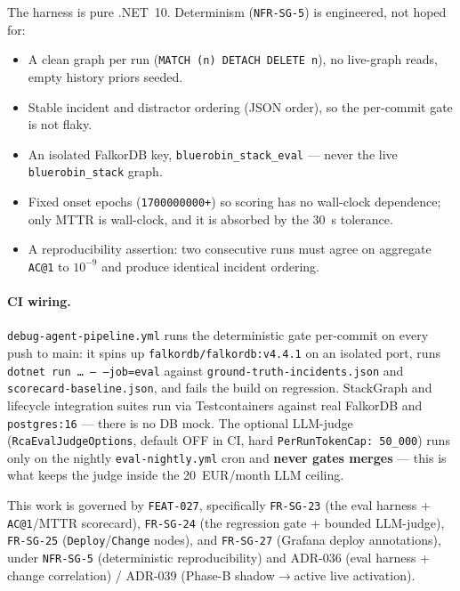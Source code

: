 \documentclass[11pt]{article}
\makeatletter
\newcommand{\acone}{\texttt{AC@1}}
\newcommand{\code}[1]{\texttt{#1}}
\makeatother
\begin{document}
The harness is pure .NET~10. Determinism (\code{NFR-SG-5}) is engineered, not hoped for:

\begin{itemize}
  \item A clean graph per run (\code{MATCH (n) DETACH DELETE n}), no live-graph reads, empty
  history priors seeded.
  \item Stable incident and distractor ordering (JSON order), so the per-commit gate is not
  flaky.
  \item An isolated FalkorDB key, \code{bluerobin\_stack\_eval} --- never the live
  \code{bluerobin\_stack} graph.
  \item Fixed onset epochs (\code{1700000000+}) so scoring has no wall-clock dependence; only
  MTTR is wall-clock, and it is absorbed by the 30~s tolerance.
  \item A reproducibility assertion: two consecutive runs must agree on aggregate \acone{} to
  $10^{-9}$ and produce identical incident ordering.
\end{itemize}

\paragraph{CI wiring.}
\code{debug-agent-pipeline.yml} runs the deterministic gate per-commit on every push to
main: it spins up \code{falkordb/falkordb:v4.4.1} on an isolated port, runs
\code{dotnet run \ldots{} -- --job=eval} against \code{ground-truth-incidents.json} and
\code{scorecard-baseline.json}, and fails the build on regression. StackGraph and lifecycle
integration suites run via Testcontainers against real FalkorDB and \code{postgres:16} ---
there is no DB mock. The optional LLM-judge (\code{RcaEvalJudgeOptions}, default OFF in CI,
hard \code{PerRunTokenCap: 50\_000}) runs only on the nightly \code{eval-nightly.yml} cron
and \textbf{never gates merges} --- this is what keeps the judge inside the
20~EUR/month LLM ceiling.

This work is governed by \code{FEAT-027}, specifically \code{FR-SG-23} (the eval harness +
\acone{}/MTTR scorecard), \code{FR-SG-24} (the regression gate + bounded LLM-judge),
\code{FR-SG-25} (\code{Deploy}/\code{Change} nodes), and \code{FR-SG-27} (Grafana deploy
annotations), under \code{NFR-SG-5} (deterministic reproducibility) and ADR-036 (eval
harness + change correlation) / ADR-039 (Phase-B shadow$\rightarrow$active live activation).
\end{document}
